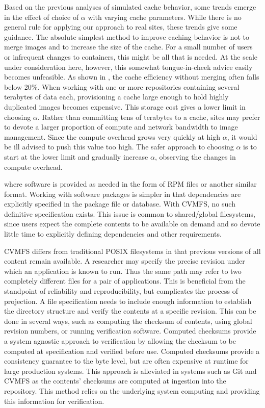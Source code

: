 \documentclass[sigconf]{acmart}
\begin{document}
Based on the previous analyses of simulated cache behavior,
some trends emerge in the effect of choice of $\alpha$ with varying cache parameters.
While there is no general rule for applying our approach to real sites,
these trends give some guidance.
The absolute simplest method to improve caching behavior is not to merge images and to increase the size of the cache.
For a small number of users or infrequent changes to containers,
this might be all that is needed.
At the scale under consideration here, however,
this somewhat tongue-in-cheek advice easily becomes unfeasible.
As shown in ,
the cache efficiency without merging often falls below 20\%.
When working with one or more repositories containing several terabytes of data each,
provisioning a cache large enough to hold highly duplicated images becomes expensive.
This storage cost gives a lower limit in choosing $\alpha$.
Rather than committing tens of terabytes to a cache,
sites may prefer to devote a larger proportion of compute and network bandwidth to image management.
Since the compute overhead grows very quickly at high $\alpha$,
it would be ill advised to push this value too high.
The safer approach to choosing $\alpha$ is to start at the lower limit and gradually increase $\alpha$,
observing the changes in compute overhead.


where software is provided as needed in the form of RPM files or another similar format.
Working with software packages is simpler in that dependencies are explicitly specified in the package file or database.
With CVMFS, no such definitive specification exists.
This issue is common to shared/global filesystems,
since users expect the complete contents to be available on demand and so devote little time to explicitly defining dependencies and other requirements.

CVMFS differs from traditional POSIX filesystems in that previous versions of all content remain available.
A researcher may specify the precise revision under which an application is known to run.
Thus the same path may refer to two completely different files for a pair of applications.
This is beneficial from the standpoint of reliability and reproducibility,
but complicates the process of projection.
A file specification needs to include enough information
to establish the directory structure and verify the contents at a specific revision.
This can be done in several ways, 
such as computing the checksum of contents,
using global revision numbers, 
or running verification software.
Computed checksums provide a system agnostic approach
to verification by allowing the checksum to be computed
at specification and verified before use.
Computed checksums provide a
consistency guarantee to the byte level,
but are often expensive at runtime for large
production systems.
This approach is alleviated in systems such as 
Git and CVMFS as the contents' checksums are 
computed at ingestion into the repository.
This method relies on the underlying system computing
and providing this information for verification.
\fi
\end{document}

